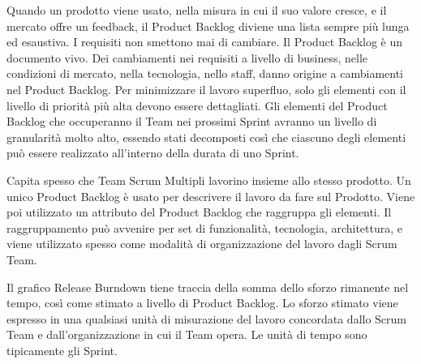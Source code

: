 Quando un prodotto viene usato, nella misura in cui il suo valore cresce, e il mercato offre un feedback, il Product Backlog diviene una lista sempre pi\`u lunga ed esaustiva.
I requisiti non smettono mai di cambiare. Il Product Backlog \`e un documento vivo. Dei cambiamenti nei requisiti a livello di business, nelle condizioni di mercato, nella tecnologia, nello staff, danno origine a cambiamenti nel Product Backlog. 
Per minimizzare il lavoro superfluo, solo gli elementi con il livello di priorit\`a pi\`u alta devono essere dettagliati. Gli elementi del Product Backlog che occuperanno il Team nei prossimi Sprint avranno un livello di granularit\`a molto alto,
essendo stati decomposti cos\`i che ciascuno degli elementi pu\`o essere realizzato all'interno della durata di uno Sprint.


Capita spesso che Team Scrum Multipli lavorino insieme allo stesso prodotto. Un unico Product Backlog \`e usato per descrivere il lavoro da fare sul Prodotto. Viene poi utilizzato un attributo del Product Backlog che raggruppa gli elementi. Il raggruppamento pu\`o avvenire per set di funzionalit\`a, tecnologia, architettura, e viene utilizzato spesso come modalit\`a  di organizzazione del lavoro dagli Scrum Team.


Il grafico Release Burndown tiene traccia della somma dello sforzo rimanente nel tempo, cos\`i come stimato a livello di Product Backlog. Lo sforzo stimato viene espresso in una qualsiasi unit\`a  di misurazione del lavoro concordata dallo Scrum Team e dall'organizzazione in cui il Team opera. Le unit\`a di tempo sono tipicamente gli Sprint.

